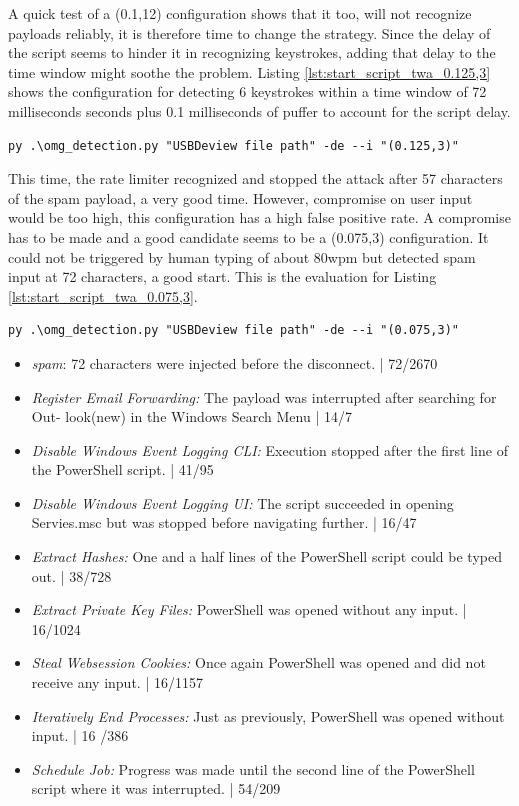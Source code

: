 A quick test of a (0.1,12) configuration shows that it too, will not recognize payloads reliably, it is therefore time to change the strategy.
Since the delay of the script seems to hinder it in recognizing keystrokes, adding that delay to the time window might soothe the problem. Listing \ref{lst:start_script_twa_0.125,3} shows the configuration for detecting 6 keystrokes within a time window of 72 milliseconds seconds plus 0.1 milliseconds of puffer to account for the script delay. 

\begin{lstlisting}[caption={start defence Script with TWA (0.125,3)},label={lst:start_script_twa_0.125,3}, captionpos=b]
 py .\omg_detection.py "USBDeview file path" -de --i "(0.125,3)"
\end{lstlisting}

This time, the rate limiter recognized and stopped the attack after 57 characters of the spam payload, a very good time. However, compromise on user input would be too high, this configuration has a high false positive rate. A compromise has to be made and a good candidate seems to be a (0.075,3) configuration. It could not be triggered by human typing of about 80wpm but detected spam input at 72 characters, a good start. This is the evaluation for Listing \ref{lst:start_script_twa_0.075,3}. 


\begin{lstlisting}[caption={start defence Script with TWA (0.075,3)},label={lst:start_script_twa_0.075,3}, captionpos=b]
 py .\omg_detection.py "USBDeview file path" -de --i "(0.075,3)"
\end{lstlisting}


\begin{itemize}
    \item  \emph{spam}: 72 characters were injected before the disconnect. | 72/2670
    \item  \emph{Register Email Forwarding:} The payload was interrupted after searching for Out-
look(new) in the Windows Search Menu | 14/7
    \item  \emph{Disable Windows Event Logging CLI:} Execution stopped after the first line of the
PowerShell script. | 41/95
    \item  \emph{Disable Windows Event Logging UI:} The script succeeded in opening Servies.msc
but was stopped before navigating further. | 16/47
    \item  \emph{Extract Hashes:}  One and a half lines of the PowerShell script could be typed out. | 38/728 
    \item  \emph{Extract Private Key Files:}  PowerShell was opened without any input. | 16/1024
    \item  \emph{Steal Websession Cookies:} Once again PowerShell was opened and did not receive any input. | 16/1157
    \item  \emph{Iteratively End Processes:} Just as previously, PowerShell was opened without input. | 16 /386
    \item  \emph{Schedule Job:}  Progress was made until the second line of the PowerShell script where it was interrupted. | 54/209
\end{itemize}

